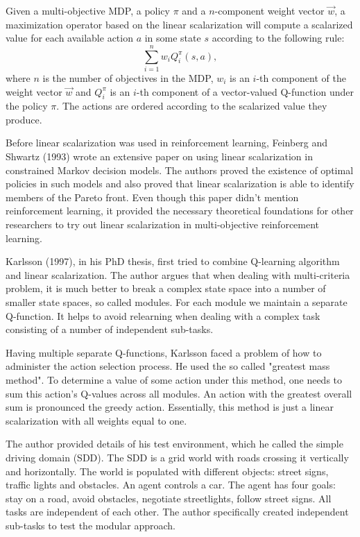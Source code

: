 Given a multi-objective MDP, a policy $\pi$ and a $n$-component weight vector $\vec{w}$, a maximization operator based on the linear scalarization will compute a scalarized value for each available action $a$ in some state $s$ according to the following rule:
$$ \displaystyle\sum_{i=1}^{n} w_{i}Q^{\pi}_{i}(s,a), $$
where $n$ is the number of objectives in the MDP, $w_{i}$ is an $i$-th component of the weight vector $\vec{w}$ and $Q^{\pi}_{i}$ is an $i$-th component of a vector-valued Q-function under the policy $\pi$. The actions are ordered according to the scalarized value they produce.

Before linear scalarization was used in reinforcement learning, Feinberg and Shwartz (1993)\nocite{Feinberg93constrainedmarkov} wrote an extensive paper on using linear scalarization in constrained Markov decision models. The authors proved the existence of optimal policies in such models and also proved that linear scalarization is able to identify members of the Pareto front. Even though this paper didn't mention reinforcement learning, it provided the necessary theoretical foundations for other researchers to try out linear scalarization in multi-objective reinforcement learning.

Karlsson (1997)\nocite{Karlsson97learningto}, in his PhD thesis, first tried to combine Q-learning algorithm and linear scalarization. The author argues that when dealing with multi-criteria problem, it is much better to break a complex state space into a number of smaller state spaces, so called modules. For each module we maintain a separate Q-function. It helps to avoid relearning when dealing with a complex task consisting of a number of independent sub-tasks.

Having multiple separate Q-functions, Karlsson faced a problem of how to administer the action selection process. He used the so called "greatest mass method". To determine a value of some action under this method, one needs to sum this action's Q-values across all modules. An action with the greatest overall sum is pronounced the greedy action. Essentially, this method is just a linear scalarization with all weights equal to one.

The author provided details of his test environment, which he called the simple driving domain (SDD). The SDD is a grid world with roads crossing it vertically and horizontally. The world is populated with different objects: street signs, traffic lights and obstacles. An agent controls a car. The agent has four goals: stay on a road, avoid obstacles, negotiate streetlights, follow street signs. All tasks are independent of each other. The author specifically created independent sub-tasks to test the modular approach.

